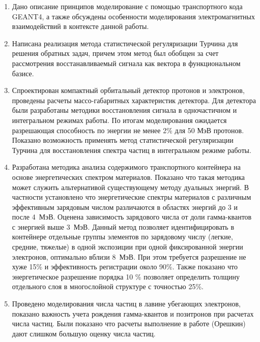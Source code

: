 \begin{enumerate}
  \item Дано описание принципов моделирование с помощью транспортного кода GEANT4, а также обсуждены особенности моделирования электромагнитных взаимодействий в контексте  данной работы.
  \item Написана реализация метода статистической регуляризации Турчина для решения обратных задач, причем этом метод был обобщен за счет рассмотрения восстанавливаемый сигнала как вектора в функциональном базисе.
  \item Спроектирован компактный орбитальный детектор протонов и электронов, проведены расчеты массо-габаритных характеристик детектора. Для детектора были разработаны методики восстановления сигнала в одночастичном и интегральном режимах работы. По итогам моделирования ожидается разрешающая способность по энергии не менее 2\% для 50 МэВ протонов. Показано возможность применять  метод статистической регуляризации Турчина для восстановления спектра частиц в интегральном режиме работы.
  \item Разработана методика анализа содержимого транспортного контейнера на основе энергетических спектром материалов. Показано что такая методика может служить альтернативой существующему методу дуальных энергий. В частности установлено что энергетические спектры материалов с различным эффективным зарядовым числом различаются в областях энергий до 3 и после 4~МэВ. Оценена зависимость зарядового числа от доли гамма-квантов с энергией выше 3~МэВ. Данный метод позволяет идентифицировать в контейнере отдельные группы элементов по зарядовому числу (легкие, средние, тяжелые) в одной экспозиции при одной фиксированной энергии электронов, оптимально вблизи 8~МэВ. При этом требуется разрешение не хуже 15\% и эффективность регистрации около 90\%. Также показано что энергетическое разрешение порядка 10 \% позволяет определить толщину отдельного слоя в многослойной структуре с точностью 25\%.
  \item Проведено моделирования числа частиц в лавине убегающих электронов, показано важность учета рождения гамма-квантов и позитронов при расчетах числа частиц. Были показано что расчеты выполнение в работе (Орешкин) дают слишком большую оценку числа частиц.

\end{enumerate}
